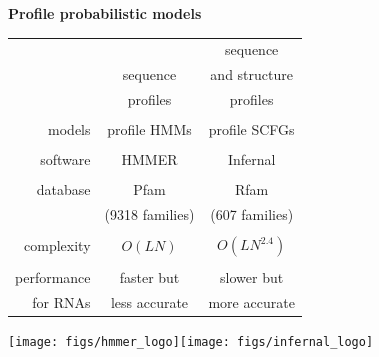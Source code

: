 \documentclass[landscape]{slides}
\begin{document}
\begin{slide}
\begin{center}
\textbf{Profile probabilistic models}
\end{center}
\medskip

\begin{center}
\small
\begin{tabular}{r|cc} 
             &         & sequence \\
             & sequence& and structure \\
             & profiles& profiles \\ \hline
  \\
  models     & profile HMMs    & profile SCFGs \\ 
  \\
  software   & {\sc HMMER}     & {\sc Infernal} \\ 
  \\
  database   & {\sc Pfam}      & {\sc Rfam} \\
             & (9318 families) & (607 families) \\
  \\
  complexity & $O(LN)$ & $O(LN^{2.4})$ \\
  \\
  performance& faster but    & slower but    \\
  for RNAs   & less accurate & more accurate \\
\end{tabular}

\hspace{1.8in}\texttt{[image: figs/hmmer\_logo]}\hspace{0.65in}\texttt{[image: figs/infernal\_logo]}

\end{center}

\vfill

\end{slide}
\end{document}
